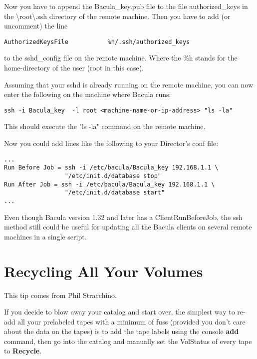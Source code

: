 Now you have to append the Bacula\_key.pub file to the file authorized\_keys
in the \textbackslash{}root\textbackslash{}.ssh directory of the remote
machine. Then you have to add (or uncomment) the line

\footnotesize
\begin{verbatim}
AuthorizedKeysFile           %h/.ssh/authorized_keys
\end{verbatim}
\normalsize

to the sshd\_config file on the remote machine. Where the \%h stands for the
home-directory of the user (root in this case).

Assuming that your sshd is already running on the remote machine, you can now
enter the following on the machine where Bacula runs:

\footnotesize
\begin{verbatim}
ssh -i Bacula_key  -l root <machine-name-or-ip-address> "ls -la"
\end{verbatim}
\normalsize

This should execute the "ls -la" command on the remote machine.

Now you could add lines like the following to your Director's conf file:

\footnotesize
\begin{verbatim}
...
Run Before Job = ssh -i /etc/bacula/Bacula_key 192.168.1.1 \
                 "/etc/init.d/database stop"
Run After Job = ssh -i /etc/bacula/Bacula_key 192.168.1.1 \
                 "/etc/init.d/database start"
...
\end{verbatim}
\normalsize

Even though Bacula version 1.32 and later has a ClientRunBeforeJob, the ssh method still
could be useful for updating all the Bacula clients on several remote machines
in a single script.

\section{Recycling All Your Volumes}
\label{recycle}

This tip comes from Phil Stracchino.

If you decide to blow away your catalog and start over, the simplest way to
re-add all your prelabeled tapes with a minimum of fuss (provided you don't
care about the data on the tapes) is to add the tape labels using the console
{\bf add} command, then go into the catalog and manually set the VolStatus of
every tape to {\bf Recycle}.

